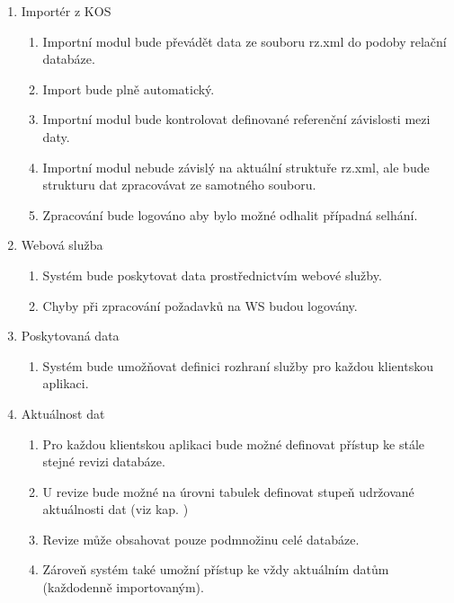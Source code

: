 \documentclass[11pt,twoside,a4paper]{book}
\begin{document}
\begin{enumerate}
\item Importér z KOS
\begin{enumerate}
\item Importní modul bude převádět data ze souboru rz.xml do podoby relační databáze.
\item Import bude plně automatický.
\item Importní modul bude kontrolovat definované referenční závislosti mezi daty.
\item Importní modul nebude závislý na aktuální struktuře rz.xml, ale bude strukturu dat zpracovávat ze samotného souboru.
\item Zpracování bude logováno aby bylo možné odhalit případná selhání.
\end{enumerate}

\item Webová služba
\begin{enumerate}
\item Systém bude poskytovat data prostřednictvím webové služby.
\item Chyby při zpracování požadavků na WS budou logovány.
\end{enumerate}

\item Poskytovaná data
\begin{enumerate}
\item Systém bude umožňovat definici rozhraní služby pro každou klientskou aplikaci.
\end{enumerate}

\item Aktuálnost dat
\begin{enumerate}
\item Pro každou klientskou aplikaci bude možné definovat přístup ke stále stejné revizi databáze.
\item U revize bude možné na úrovni tabulek definovat stupeň udržované aktuálnosti dat (viz kap. \pageref{rozbor})
\item Revize může obsahovat pouze podmnožinu celé databáze.
\item Zároveň systém také umožní přístup ke vždy aktuálním datům (každodenně importovaným).
\end{enumerate}
\end{enumerate}
\end{document}
